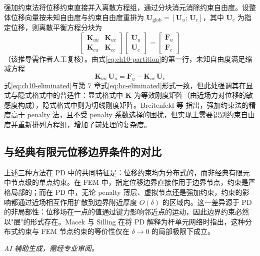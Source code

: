 强加约束法将位移约束直接并入离散方程组，通过分块消元消除约束自由度。设整体位移向量按未知自由度与约束自由度重排为 $\mathbf{U}_{\text{glob}}=[\mathbf{U}_{u};\,\mathbf{U}_{c}]$，其中 $\mathbf{U}_{c}$ 为指定位移，则离散平衡方程分块为
\begin{equation}
\begin{bmatrix}
\mathbf{K}_{uu} & \mathbf{K}_{uc}\\
\mathbf{K}_{cu} & \mathbf{K}_{cc}
\end{bmatrix}
\begin{bmatrix}
\mathbf{U}_{u}\\
\mathbf{U}_{c}
\end{bmatrix}
=
\begin{bmatrix}
\mathbf{F}_{u}\\
\mathbf{F}_{c}
\end{bmatrix}
\label{eq:ch10-partition}
\end{equation}
（该推导需作者人工复核）。由式\eqref{eq:ch10-partition}的第一行，未知自由度满足缩减方程
\begin{equation}
\mathbf{K}_{uu}\,\mathbf{U}_{u} = \mathbf{F}_{u} - \mathbf{K}_{uc}\,\mathbf{U}_{c}
\label{eq:ch10-eliminated}
\end{equation}
式\eqref{eq:ch10-eliminated}与第 7 章式\eqref{eq:bc-eliminated}形式一致，但此处强调其在显式与隐式格式中的普适性：显式格式中 $\mathbf{K}$ 为等效刚度矩阵（由近场力对位移的敏感度构成），隐式格式中则为切线刚度矩阵。Breitenfeld 等 \cite{Breitenfeld2014} 指出，强加约束法的精度高于 penalty 法，且不受 penalty 系数选择的困扰，但实现上需要识别约束自由度并重新排列方程组，增加了前处理的复杂度。

\subsection{与经典有限元位移边界条件的对比}

上述三种方法在 PD 中的共同特征是：位移约束均为分布式的，而非经典有限元中节点级的单点约束。在 FEM 中，指定位移边界直接作用于边界节点，约束是严格局部的；而在 PD 中，无论 penalty 薄层、虚拟节点还是强加约束，约束的影响都通过近场相互作用扩散到边界附近厚度 $O(\delta)$ 的区域内。这一差异源于 PD 的非局部性：位移场在一点的值通过键力影响邻近点的运动，因此边界约束必然以"层"的形式存在。Macek 与 Silling \cite{Macek2007} 在将 PD 解释为杆单元网络时指出，这种分布式约束与 FEM 节点约束的等价性仅在 $\delta\to 0$ 的局部极限下成立。

\emph{AI 辅助生成，需经专业审阅。}


